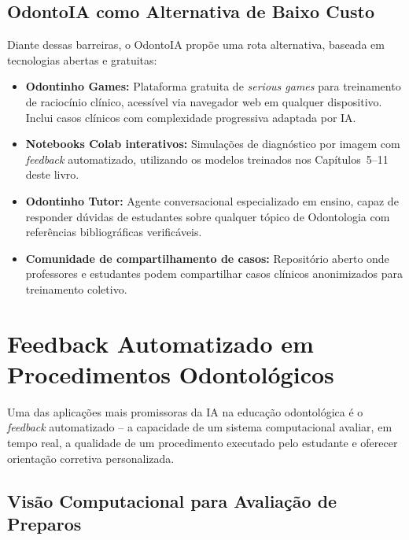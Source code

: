 \subsection{OdontoIA como Alternativa de Baixo Custo}

Diante dessas barreiras, o OdontoIA propõe uma rota alternativa, baseada em
tecnologias abertas e gratuitas:

\begin{itemize}
  \item \textbf{Odontinho Games:} Plataforma gratuita de \textit{serious games}
    para treinamento de raciocínio clínico, acessível via navegador web em
    qualquer dispositivo. Inclui casos clínicos com complexidade progressiva
    adaptada por IA.

  \item \textbf{Notebooks Colab interativos:} Simulações de diagnóstico por
    imagem com \textit{feedback} automatizado, utilizando os modelos treinados
    nos Capítulos~5--11 deste livro.

  \item \textbf{Odontinho Tutor:} Agente conversacional especializado em ensino,
    capaz de responder dúvidas de estudantes sobre qualquer tópico de
    Odontologia com referências bibliográficas verificáveis.

  \item \textbf{Comunidade de compartilhamento de casos:} Repositório aberto
    onde professores e estudantes podem compartilhar casos clínicos anonimizados
    para treinamento coletivo.
\end{itemize}


\section{Feedback Automatizado em Procedimentos Odontológicos}
\label{sec:feedback-automatizado}

\nivelcinco

Uma das aplicações mais promissoras da IA na educação odontológica é o
\textit{feedback} automatizado -- a capacidade de um sistema computacional
avaliar, em tempo real, a qualidade de um procedimento executado pelo estudante
e oferecer orientação corretiva personalizada.

\subsection{Visão Computacional para Avaliação de Preparos}

